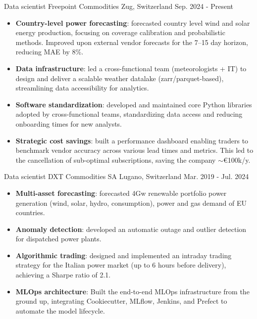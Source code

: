 
\begin{cventries}
  \cventry
    {Data scientist}
    {Freepoint Commodities}
    {Zug, Switzerland}
    {Sep. 2024 - Present}
    {
    \begin{itemize}
        \item \textbf{Country-level power forecasting}: forecasted country level wind and solar energy production, focusing on coverage calibration and probabilistic methods. Improved upon external vendor forecasts for the 7–15 day horizon, reducing MAE by 8\%.
        \item \textbf{Data infrastructure}: led a cross-functional team (meteorologists + IT) to design and deliver a scalable weather datalake (zarr/parquet-based), streamlining data accessibility for analytics.
        \item \textbf{Software standardization}: developed and maintained core Python libraries adopted by cross-functional teams, standardizing data access and reducing onboarding times for new analysts.
        \item \textbf{Strategic cost savings}: built a performance dashboard enabling traders to benchmark vendor accuracy across various lead times and metrics. This led to the cancellation of sub-optimal subscriptions, saving the company $\sim$€100k/y.
    \end{itemize}
    }





  \cventry
    {Data scientist}
    {DXT Commodities SA}
    {Lugano, Switzerland}
    {Mar. 2019 - Jul. 2024}
    {
    \begin{itemize}
        \item \textbf{Multi-asset forecasting}: forecasted 4Gw renewable portfolio power generation (wind, solar, hydro, consumption), power and gas demand of EU countries.
        \item \textbf{Anomaly detection}: developed an automatic outage and outlier detection for dispatched power plants.
        \item \textbf{Algorithmic trading}: designed and implemented an intraday trading strategy for the Italian power market (up to 6 hours before delivery), achieving a Sharpe ratio of 2.1.
        \item \textbf{MLOps architecture}: Built the end-to-end MLOps infrastructure from the ground up, integrating Cookiecutter, MLflow, Jenkins, and Prefect to automate the model lifecycle.
    \end{itemize}
    }
    

\end{cventries}
